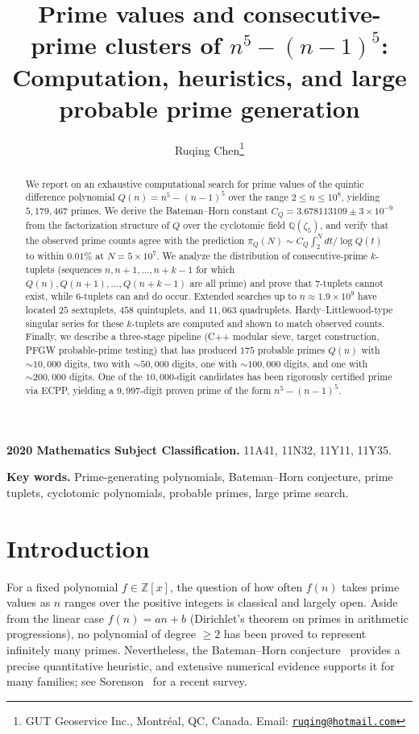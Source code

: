 \documentclass[11pt,a4paper]{article}
\title{Prime values and consecutive-prime clusters of \texorpdfstring{$n^5-(n-1)^5$}{n\^{}5-(n-1)\^{}5}: \\[4pt] Computation, heuristics, and large probable prime generation}
\author{Ruqing Chen\thanks{GUT Geoservice Inc., Montr\'eal, QC, Canada.  Email: \href{mailto:ruqing@hotmail.com}{\texttt{ruqing@hotmail.com}}}}
\date{}
\theoremstyle{plain}
\theoremstyle{definition}
\theoremstyle{remark}
\begin{document}
\maketitle

\begin{abstract}
We report on an exhaustive computational search for prime values of the quintic difference polynomial $Q(n) = n^5 - (n-1)^5$ over the range $2 \le n \le 10^8$, yielding $5{,}179{,}467$ primes.
We derive the Bateman--Horn constant $C_Q = 3.678113109 \pm 3 \times 10^{-9}$ from the factorization structure of $Q$ over the cyclotomic field $\mathbb{Q}(\zeta_5)$, and verify that the observed prime counts agree with the prediction $\pi_Q(N) \sim C_Q \int_2^N dt/\!\log Q(t)$ to within $0.01\%$ at $N = 5 \times 10^7$.
We analyze the distribution of consecutive-prime $k$-tuplets (sequences $n, n{+}1, \ldots, n{+}k{-}1$ for which $Q(n), Q(n{+}1), \ldots, Q(n{+}k{-}1)$ are all prime) and prove that $7$-tuplets cannot exist, while $6$-tuplets can and do occur.
Extended searches up to $n \approx 1.9 \times 10^9$ have located $25$ sextuplets, $458$ quintuplets, and $11{,}063$ quadruplets.
Hardy--Littlewood-type singular series for these $k$-tuplets are computed and shown to match observed counts.
Finally, we describe a three-stage pipeline (C++ modular sieve, target construction, PFGW probable-prime testing) that has produced $175$ probable primes $Q(n)$ with $\sim\! 10{,}000$ digits, two with $\sim\! 50{,}000$ digits, one with $\sim\! 100{,}000$ digits, and one with $\sim\! 200{,}000$ digits. One of the $10{,}000$-digit candidates has been rigorously certified prime via ECPP, yielding a $9{,}997$-digit proven prime of the form $n^5-(n-1)^5$.
\end{abstract}

\bigskip
\noindent \textbf{2020 Mathematics Subject Classification.} 11A41, 11N32, 11Y11, 11Y35.

\noindent \textbf{Key words.} Prime-generating polynomials, Bateman--Horn conjecture, prime tuplets, cyclotomic polynomials, probable primes, large prime search.

\section{Introduction}
\label{sec:intro}

For a fixed polynomial $f \in \mathbb{Z}[x]$, the question of how often $f(n)$ takes prime values as $n$ ranges over the positive integers is classical and largely open. Aside from the linear case $f(n) = an + b$ (Dirichlet's theorem on primes in arithmetic progressions), no polynomial of degree $\ge 2$ has been proved to represent infinitely many primes. Nevertheless, the Bateman--Horn conjecture~\cite{bateman1962} provides a precise quantitative heuristic, and extensive numerical evidence supports it for many families; see Sorenson~\cite{sorenson2024} for a recent survey.
\end{document}
